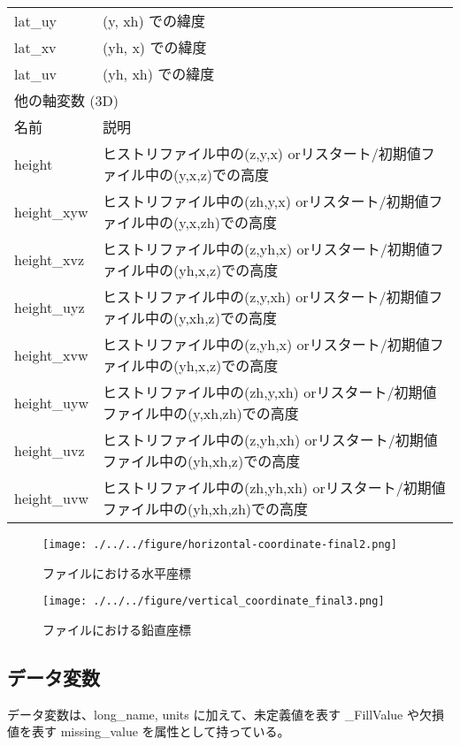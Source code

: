 \begin{longtable}{l|l}
lat\_uy & (y, xh) での緯度 \\
lat\_xv & (yh, x) での緯度 \\
lat\_uv & (yh, xh) での緯度 \\
\hline
\multicolumn{2}{l}{他の軸変数 (3D)}\\ \hline
名前 & 説明 \\ \hline \hline
height      & ヒストリファイル中の(z,y,x) orリスタート/初期値ファイル中の(y,x,z)での高度\\
height\_xyw & ヒストリファイル中の(zh,y,x) orリスタート/初期値ファイル中の(y,x,zh)での高度\\
height\_xvz & ヒストリファイル中の(z,yh,x) orリスタート/初期値ファイル中の(yh,x,z)での高度\\
height\_uyz & ヒストリファイル中の(z,y,xh) orリスタート/初期値ファイル中の(y,xh,z)での高度\\
height\_xvw & ヒストリファイル中の(z,yh,x) orリスタート/初期値ファイル中の(yh,x,z)での高度\\
height\_uyw & ヒストリファイル中の(zh,y,xh) orリスタート/初期値ファイル中の(y,xh,zh)での高度\\
height\_uvz & ヒストリファイル中の(z,yh,xh) orリスタート/初期値ファイル中の(yh,xh,z)での高度\\
height\_uvw & ヒストリファイル中の(zh,yh,xh) orリスタート/初期値ファイル中の(yh,xh,zh)での高度\\
\end{longtable}

\begin{figure}[tbh]
\begin{center}
  \texttt{[image: ./../../figure/horizontal-coordinate-final2.png]}\\
  \caption{{\scalenetcdf}ファイルにおける水平座標}
  \label{fig:netcdfhorizontalcoordinate}
\end{center}
\end{figure}
\begin{figure}[tbh]
\begin{center}
  \texttt{[image: ./../../figure/vertical\_coordinate\_final3.png]}\\
  \caption{{\scalenetcdf}ファイルにおける鉛直座標}
  \label{fig:netcdfverticalcoordinate}
\end{center}
\end{figure}

\subsection{データ変数}
データ変数は、long\_name, units に加えて、未定義値を表す \_FillValue や欠損値を表す missing\_value を属性として持っている。

